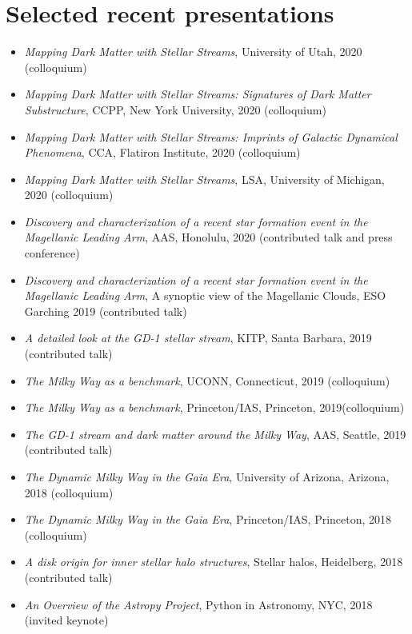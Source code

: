 \documentclass[12pt, letterpaper]{apw-cv}
\begin{document}
\section*{Selected recent presentations}

\begin{itemize}
    \item \emph{Mapping Dark Matter with Stellar Streams}, University of Utah, 2020 (colloquium)
    \item \emph{Mapping Dark Matter with Stellar Streams: Signatures of Dark Matter Substructure}, CCPP, New York University, 2020 (colloquium)
    \item \emph{Mapping Dark Matter with Stellar Streams: Imprints of Galactic Dynamical Phenomena}, CCA, Flatiron Institute, 2020 (colloquium)
    \item \emph{Mapping Dark Matter with Stellar Streams}, LSA, University of Michigan, 2020 (colloquium)
    \item \emph{Discovery and characterization of a recent star formation event in the Magellanic Leading Arm}, AAS, Honolulu, 2020 (contributed talk and press conference)
    \item \emph{Discovery and characterization of a recent star formation event in the Magellanic Leading Arm}, A synoptic view of the Magellanic Clouds, ESO Garching 2019 (contributed talk)
    \item \emph{A detailed look at the GD-1 stellar stream}, KITP, Santa Barbara, 2019 (contributed talk)
    \item \emph{The Milky Way as a benchmark}, UCONN, Connecticut, 2019 (colloquium)
    \item \emph{The Milky Way as a benchmark}, Princeton/IAS, Princeton, 2019(colloquium)
    \item \emph{The GD-1 stream and dark matter around the Milky Way}, AAS, Seattle, 2019 (contributed talk)
    \item \emph{The Dynamic Milky Way in the Gaia Era}, University of Arizona, Arizona, 2018 (colloquium)
    \item \emph{The Dynamic Milky Way in the Gaia Era}, Princeton/IAS, Princeton, 2018 (colloquium)
    \item \emph{A disk origin for inner stellar halo structures}, Stellar halos, Heidelberg, 2018 (contributed talk)
    \item \emph{An Overview of the Astropy Project}, Python in Astronomy, NYC, 2018 (invited keynote)

\end{itemize}
\end{document}
